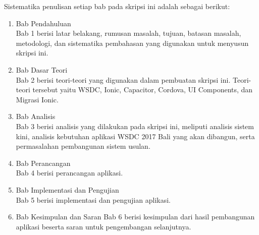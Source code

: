 Sistematika penulisan setiap bab pada skripsi ini adalah sebagai berikut:
\begin{enumerate}
	\item Bab Pendahuluan \\
	Bab 1 berisi latar belakang, rumusan masalah, tujuan, batasan masalah, metodologi, dan sistematika pembahasan yang digunakan untuk menyusun skripsi ini.
	\item Bab Dasar Teori \\
	Bab 2 berisi teori-teori yang digunakan dalam pembuatan skripsi ini. Teori-teori tersebut yaitu WSDC, Ionic, Capacitor, Cordova, UI Components, dan Migrasi Ionic.
	\item Bab Analisis \\
	Bab 3 berisi analisis yang dilakukan pada skripsi ini, meliputi analisis sistem kini, analisis kebutuhan aplikasi WSDC 2017 Bali yang akan dibangun, serta permasalahan pembangunan sistem usulan.
	\item Bab Perancangan \\
	Bab 4 berisi perancangan aplikasi.
	\item Bab Implementasi dan Pengujian \\
	Bab 5 berisi implementasi dan pengujian aplikasi.
	\item Bab Kesimpulan dan Saran
	Bab 6 berisi kesimpulan dari hasil pembangunan aplikasi beserta saran untuk pengembangan selanjutnya.
	\end{enumerate}